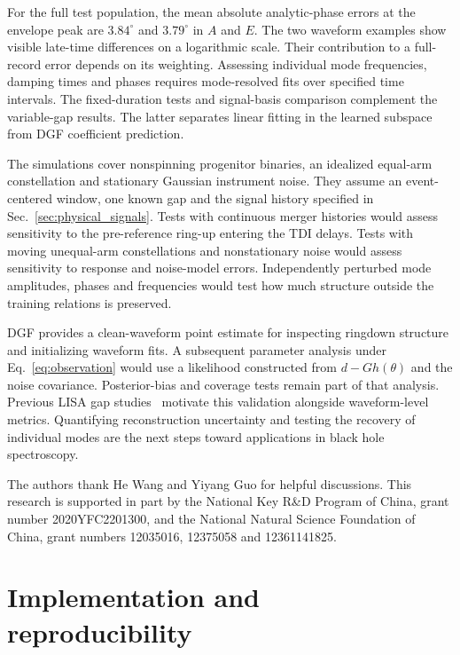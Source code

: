 \documentclass[10pt,prd,aps,a4paper,twocolumn,superscriptaddress,nofootinbib,floatfix]{revtex4-2}
\begin{document}
For the full test population, the mean absolute analytic-phase errors at the envelope peak are $3.84^\circ$ and $3.79^\circ$ in $A$ and $E$. The two waveform examples show visible late-time differences on a logarithmic scale. Their contribution to a full-record error depends on its weighting. Assessing individual mode frequencies, damping times and phases requires mode-resolved fits over specified time intervals. The fixed-duration tests and signal-basis comparison complement the variable-gap results. The latter separates linear fitting in the learned subspace from DGF coefficient prediction.

The simulations cover nonspinning progenitor binaries, an idealized equal-arm constellation and stationary Gaussian instrument noise. They assume an event-centered window, one known gap and the signal history specified in Sec.~\ref{sec:physical_signals}. Tests with continuous merger histories would assess sensitivity to the pre-reference ring-up entering the TDI delays. Tests with moving unequal-arm constellations and nonstationary noise would assess sensitivity to response and noise-model errors. Independently perturbed mode amplitudes, phases and frequencies would test how much structure outside the training relations is preserved.

DGF provides a clean-waveform point estimate for inspecting ringdown structure and initializing waveform fits. A subsequent parameter analysis under Eq.~\eqref{eq:observation} would use a likelihood constructed from $d-Gh(\theta)$ and the noise covariance. Posterior-bias and coverage tests remain part of that analysis. Previous LISA gap studies~\cite{Baghi2019,Mao:2025cae} motivate this validation alongside waveform-level metrics. Quantifying reconstruction uncertainty and testing the recovery of individual modes are the next steps toward applications in black hole spectroscopy.

\begin{acknowledgments}
The authors thank He Wang and Yiyang Guo for helpful discussions. This research is supported in part by the National Key R\&D Program of China, grant number 2020YFC2201300, and the National Natural Science Foundation of China, grant numbers 12035016, 12375058 and 12361141825.

\end{acknowledgments}
\clearpage
\appendix
\section{Implementation and reproducibility}\label{app:model_analysis}
\end{document}
